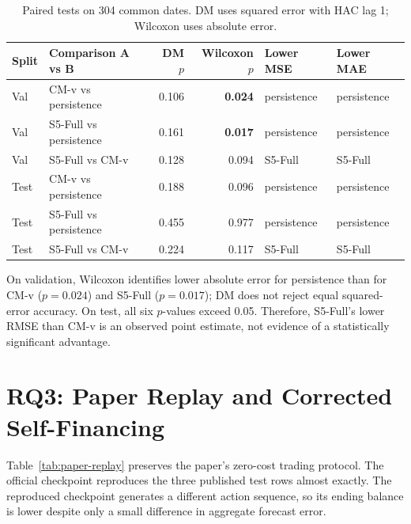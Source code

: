 \documentclass[13pt,a4paper,oneside]{report}
\begin{document}
\begin{table}[H]
\centering
\caption{Paired tests on 304 common dates. DM uses squared error with HAC lag 1; Wilcoxon uses
absolute error.}
\label{tab:paired-tests}
{\small
\begin{tabularx}{\linewidth}{@{}llrrll@{}}
\toprule
\textbf{Split} & \textbf{Comparison A vs B} & \textbf{DM $p$} & \textbf{Wilcoxon $p$} & \textbf{Lower MSE} & \textbf{Lower MAE} \\
\midrule
Val & CM-v vs persistence & \num{0.106} & \textbf{\num{0.024}} & persistence & persistence \\
Val & S5-Full vs persistence & \num{0.161} & \textbf{\num{0.017}} & persistence & persistence \\
Val & S5-Full vs CM-v & \num{0.128} & \num{0.094} & S5-Full & S5-Full \\
\midrule
Test & CM-v vs persistence & \num{0.188} & \num{0.096} & persistence & persistence \\
Test & S5-Full vs persistence & \num{0.455} & \num{0.977} & persistence & persistence \\
Test & S5-Full vs CM-v & \num{0.224} & \num{0.117} & S5-Full & S5-Full \\
\bottomrule
\end{tabularx}}
\end{table}

On validation, Wilcoxon identifies lower absolute error for persistence than for CM-v
($p=\num{0.024}$) and S5-Full ($p=\num{0.017}$); DM does not reject equal squared-error accuracy.
On test, all six $p$-values exceed 0.05. Therefore, S5-Full's lower RMSE than CM-v is an observed
point estimate, not evidence of a statistically significant advantage.

\section{RQ3: Paper Replay and Corrected Self-Financing}\label{sec:rq3-results}
Table~\ref{tab:paper-replay} preserves the paper's zero-cost trading protocol. The official
checkpoint reproduces the three published test rows almost exactly. The reproduced checkpoint
generates a different action sequence, so its ending balance is lower despite only a small
difference in aggregate forecast error.
\end{document}
